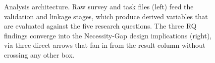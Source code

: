 \begin{figure}[!htbp]
{%
}
\caption{Analysis architecture. Raw survey and task files (left) feed
the validation and linkage stages, which produce derived variables
that are evaluated against the five research questions. The three RQ
findings converge into the Necessity-Gap design implications (right),
via three direct arrows that fan in from the result column without
crossing any other box.}
\label{fig:analysis-architecture}
\end{figure}
